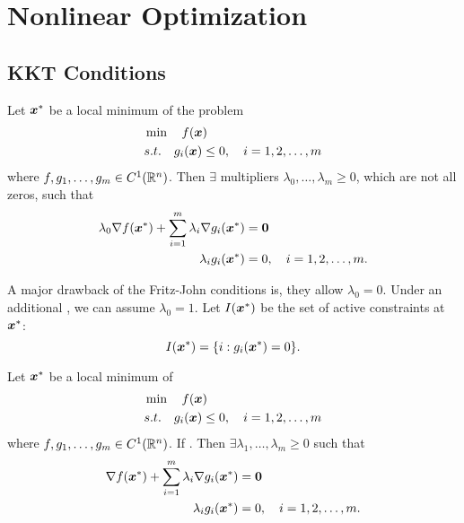 \documentclass[10pt,a4paper]{book}
\begin{document}
\section{Nonlinear Optimization}\label{sec:nonlinearOPT}
\subsection{KKT Conditions}\label{sec:KKT}
\begin{thmbox}
	\begin{theorem}\label{thm:KKT-FJnecessary}
		Let ${\boldsymbol x}^*$ be a local minimum of the problem
		\begin{align*}
		&\min\quad f({\boldsymbol x})\\
		&s.t.\quad g_i({\boldsymbol x})\leq0,\quad i=1,2,\ldots,m
		\end{align*}
		where $f,g_1,\ldots,g_m\in C^1(\mathbb R^n)$. Then $\exists$ multipliers $\lambda_0,\ldots,\lambda_m\geq 0$, which are not all zeros, such that  
		\begin{align*}
			\lambda_0\nabla f({\boldsymbol x}^*)+\sum_{i=1}^m\lambda_i\nabla g_i({\boldsymbol x}^*)& ={\boldsymbol 0} \\
			\lambda_ig_i({\boldsymbol x}^*)& =0, \quad i=1,2,\ldots,m.
		\end{align*} 
	\end{theorem}	
\end{thmbox}

A major drawback of the Fritz-John conditions is, they allow $\lambda_0=0$. Under an additional , we can assume $\lambda_0=1$. Let $I({\boldsymbol x}^*)$ be the set of active constraints at ${\boldsymbol x}^*$: 
\begin{equation*}
	I({\boldsymbol x}^*)=\{i:g_i({\boldsymbol x}^*)=0\}.
\end{equation*}
\begin{thmbox}
	\begin{theorem}\label{thm:KKT-ineq_constrained}
		Let ${\boldsymbol x}^*$ be a local minimum of 
		\begin{align*}
		&\min\quad f({\boldsymbol x})\\
		&s.t.\quad g_i({\boldsymbol x})\leq0,\quad i=1,2,\ldots,m
		\end{align*}
		where $f,g_1,\ldots,g_m\in C^1(\mathbb R^n)$. If . Then $\exists \lambda_1,\ldots,\lambda_m\geq 0$ such that  
		\begin{align*}
			\nabla f({\boldsymbol x}^*)+\sum_{i=1}^m\lambda_i\nabla g_i({\boldsymbol x}^*)& ={\boldsymbol 0} \\
			\lambda_ig_i({\boldsymbol x}^*)& =0, \quad i=1,2,\ldots,m.
		\end{align*} 
	\end{theorem}	
\end{thmbox}
\end{document}
